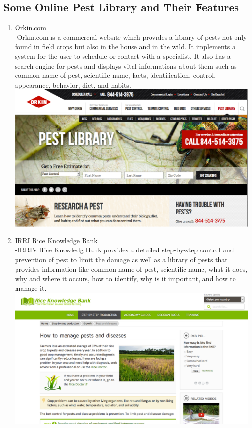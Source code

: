 \documentclass[journal]{./IEEE/IEEEtran}
\begin{document}
\subsection{Some Online Pest Library and Their Features}
	\begin{enumerate}
	\item Orkin.com\\
	-Orkin.com is a commercial website which provides a library of pests not only found in field crops but also in the house and in the wild. It implements a system for the user to schedule or contact with a specialist. It also has a search engine for pests and displays vital informations about them such as common name of pest, scientific name, facts, identification, control, appearance, behavior, diet, and habits.\cite{electronic_orkin}\\
	\includegraphics[scale=0.17]{images/orkin.png}	\\
	\item IRRI Rice Knowledge Bank\\
	-IRRI's Rice Knowledg Bank provides a detailed step-by-step control and prevention of pest to limit the damage as well as a library of pests that provides information like common name of pest, scientific name, what it does, why and where it occurs, how to identify, why is it important, and how to manage it.\cite{electronic_irri}\\
	\includegraphics[scale=0.17]{images/irri.png}	\\
	\end{enumerate}
\end{document}
